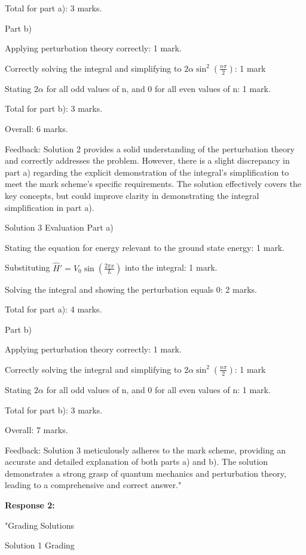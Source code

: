 \documentclass[a4paper,11pt]{article}
\begin{document}
Total for part a): 3 marks.

Part b)

Applying perturbation theory correctly: 1 mark.

Correctly solving the integral and simplifying to \( 2\alpha \sin^2(\frac{n\pi}{2})\): 1 mark

Stating \(2\alpha\) for all odd values of n, and 0 for all even values of n: 1 mark.

Total for part b): 3 marks.

Overall: 6 marks.

Feedback: Solution 2 provides a solid understanding of the perturbation theory and correctly addresses the problem. However, there is a slight discrepancy in part a) regarding the explicit demonstration of the integral's simplification to meet the mark scheme's specific requirements. The solution effectively covers the key concepts, but could improve clarity in demonstrating the integral simplification in part a).

Solution 3 Evaluation
Part a)

Stating the equation for energy relevant to the ground state energy: 1 mark.

Substituting \(\hat{H}' = V_0 \sin(\frac{2 \pi x}{L})\) into the integral: 1 mark.

Solving the integral and showing the perturbation equals 0: 2 marks.

Total for part a): 4 marks.

Part b)

Applying perturbation theory correctly: 1 mark.

Correctly solving the integral and simplifying to \( 2\alpha \sin^2(\frac{n\pi}{2})\): 1 mark

Stating \(2\alpha\) for all odd values of n, and 0 for all even values of n: 1 mark.

Total for part b): 3 marks.

Overall: 7 marks.

Feedback: Solution 3 meticulously adheres to the mark scheme, providing an accurate and detailed explanation of both parts a) and b). The solution demonstrates a strong grasp of quantum mechanics and perturbation theory, leading to a comprehensive and correct answer."

\textbf{Response 2:}

"Grading Solutions

Solution 1 Grading
\end{document}
